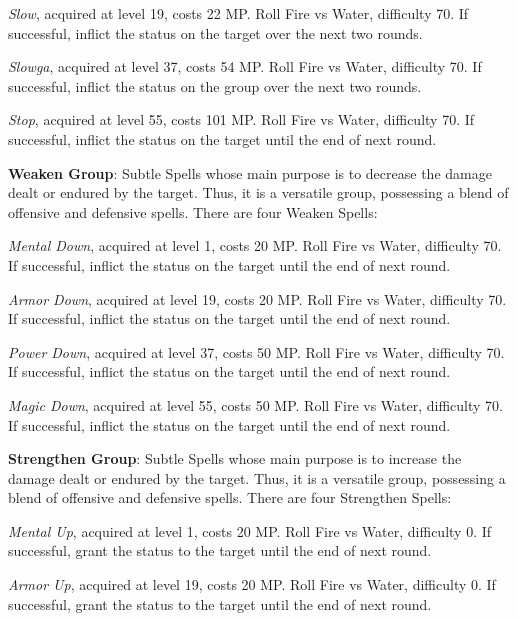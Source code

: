 \begin{multicols}{2}
    \textit{Slow}, acquired at level 19, costs 22 MP. Roll Fire vs Water, difficulty 70. If successful, inflict the  status on the target over the next two rounds.
    
    \textit{Slowga}, acquired at level 37, costs 54 MP. Roll Fire vs Water, difficulty 70. If successful, inflict the  status on the group over the next two rounds.
    
    \textit{Stop}, acquired at level 55, costs 101 MP. Roll Fire vs Water, difficulty 70. If successful, inflict the  status on the target until the end of next round.
    
    \textbf{Weaken Group}: Subtle Spells whose main purpose is to decrease the damage dealt or endured by the target. Thus, it is a versatile group, possessing a blend of offensive and defensive spells. There are four Weaken Spells:
    
    \textit{Mental Down}, acquired at level 1, costs 20 MP. Roll Fire vs Water, difficulty 70. If successful, inflict the  status on the target until the end of next round.
    
    \textit{Armor Down}, acquired at level 19, costs 20 MP. Roll Fire vs Water, difficulty 70. If successful, inflict the  status on the target until the end of next round.
    
    \textit{Power Down}, acquired at level 37, costs 50 MP. Roll Fire vs Water, difficulty 70. If successful, inflict the  status on the target until the end of next round.
    
    \textit{Magic Down}, acquired at level 55, costs 50 MP. Roll Fire vs Water, difficulty 70. If successful, inflict the  status on the target until the end of next round.
    
    \textbf{Strengthen Group}: Subtle Spells whose main purpose is to increase the damage dealt or endured by the target. Thus, it is a versatile group, possessing a blend of offensive and defensive spells. There are four Strengthen Spells:
    
    \textit{Mental Up}, acquired at level 1, costs 20 MP. Roll Fire vs Water, difficulty 0. If successful, grant the  status to the target until the end of next round.

    \textit{Armor Up}, acquired at level 19, costs 20 MP. Roll Fire vs Water, difficulty 0. If successful, grant the  status to the target until the end of next round.
    

\end{multicols}
